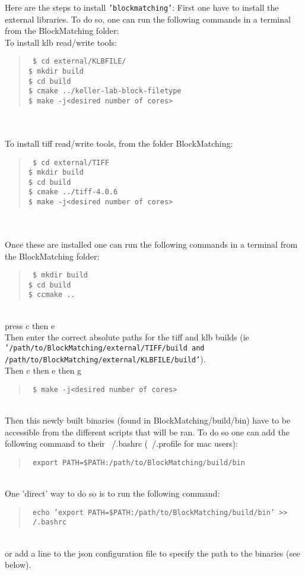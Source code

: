 \documentclass[10pt,a4paper]{book}
\newcommand{\option}[1]{{\texttt{'#1'}}}
\newenvironment{code}[1]{\mbox{}\\[1ex]\hspace*{-#1cm}\begin{minipage}{150mm}\begin{quote}\tt}{\end{quote}\end{minipage}\mbox{}\\[1ex]}
\begin{document}
Here are the steps to install \option{blockmatching}:
First one have to install the external libraries. To do so, one can run the following commands in a terminal from the BlockMatching folder:\\

To install klb read/write tools:
\begin{code}{0.8}
\$ cd external/KLBFILE/ \\
\$ mkdir build \\
\$ cd build \\
\$ cmake ../keller-lab-block-filetype \\
\$ make -j<desired number of cores> \\
\end{code}
\\
To install tiff read/write tools, from the folder BlockMatching:
\begin{code}{0.8}
\$ cd external/TIFF \\
\$ mkdir build \\
\$ cd build \\
\$ cmake ../tiff-4.0.6 \\
\$ make -j<desired number of cores> \\
\end{code}
\\
Once these are installed one can run the following commands in a terminal from the BlockMatching folder:
\begin{code}{0.8}
\$ mkdir build \\
\$ cd build \\
\$ ccmake .. \\
\end{code}
press c then e\\
Then enter the correct absolute paths for the tiff and klb builds (ie \option{/path/to/BlockMatching/external/TIFF/build and /path/to/BlockMatching/external/KLBFILE/build}).\\
Then c then e then g
\begin{code}{0.8}
\$ make -j<desired number of cores> \\
\end{code}
Then this newly built binaries (found in BlockMatching/build/bin) have to be accessible from the different scripts that will be ran. To do so one can add the following command to their ~/.bashrc (~/.profile for mac users):
\begin{code}{0.8}
export PATH=\$PATH:/path/to/BlockMatching/build/bin
\end{code}
One 'direct' way to do so is to run the following command:
\begin{code}{0.8}
echo 'export PATH=\$PATH:/path/to/BlockMatching/build/bin' >> ~/.bashrc
\end{code}
or add a line to the json configuration file to specify the path to the binaries (see below).\\
\end{document}

